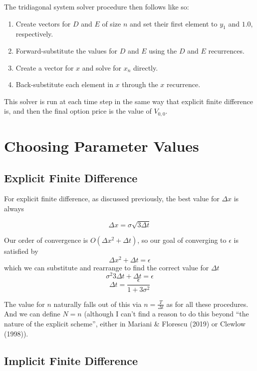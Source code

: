 \documentclass[11pt]{article}
\providecommand{\tightlist}{%
      \setlength{\itemsep}{0pt}\setlength{\parskip}{0pt}}
\begin{document}
    The tridiagonal system solver procedure then follows like so:

\begin{enumerate}
\def\labelenumi{\arabic{enumi}.}
\tightlist
\item
  Create vectors for \(D\) and \(E\) of size \(n\) and set their first
  element to \(y_1\) and \(1.0\), respectively.
\item
  Forward-substitute the values for \(D\) and \(E\) using the \(D\) and
  \(E\) recurrences.
\item
  Create a vector for \(x\) and solve for \(x_n\) directly.
\item
  Back-substitute each element in \(x\) through the \(x\) recurrence.
\end{enumerate}

    This solver is run at each time step in the same way that explicit
finite difference is, and then the final option price is the value of
\(V_{0, 0}\).

    \section{Choosing Parameter Values}\label{choosing-parameter-values}

    \subsection{Explicit Finite
Difference}\label{explicit-finite-difference}

    For explicit finite difference, as discussed previously, the best value
for \(\Delta x\) is always

\[\Delta x = \sigma \sqrt{3 \Delta t}\]

Our order of convergence is \(O(\Delta x^2 + \Delta t)\), so our goal of
converging to \(\epsilon\) is satisfied by
\[\Delta x^2 + \Delta t = \epsilon\] which we can substitute and
rearrange to find the correct value for \(\Delta t\)
\[\sigma^2 3 \Delta t + \Delta t = \epsilon\]
\[\Delta t = \frac{\epsilon}{1 + 3 \sigma^2}\]

The value for \(n\) naturally falls out of this via
\(n = \frac{T}{\Delta t}\) as for all these procedures. And we can
define \(N = n\) (although I can't find a reason to do this beyond ``the
nature of the explicit scheme'', either in Mariani \& Florescu (2019) or
Clewlow (1998)).

    \subsection{Implicit Finite
Difference}\label{implicit-finite-difference}
\end{document}

